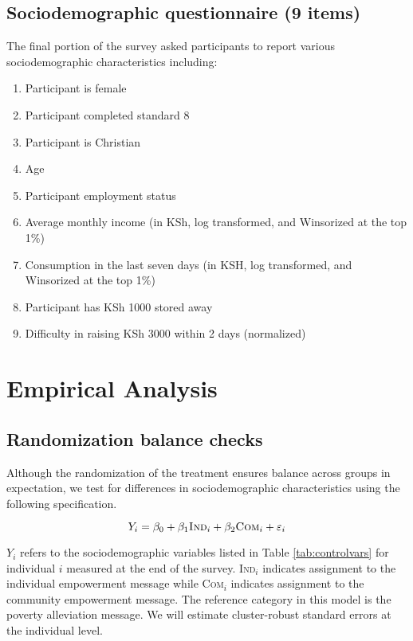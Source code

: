 \documentclass[11pt, a4paper]{article}\usepackage[]{graphicx}\usepackage[]{color}
\begin{document}
    \subsection{Sociodemographic questionnaire (9 items)}

        The final portion of the survey asked participants to report various sociodemographic characteristics including:

        \begin{enumerate}
        \itemsep0em
            \item Participant is female
            \item Participant completed standard 8
            \item Participant is Christian
            \item Age
            \item Participant employment status
            \item Average monthly income (in KSh, log transformed, and Winsorized at the top 1\%)
            \item Consumption in the last seven days (in KSH, log transformed, and Winsorized at the top 1\%)
            \item Participant has KSh 1000 stored away
            \item Difficulty in raising KSh 3000 within 2 days (normalized)
        \end{enumerate}

\section{Empirical Analysis}

    \subsection{Randomization balance checks}

        Although the randomization of the treatment ensures balance across groups in expectation, we test for differences in sociodemographic characteristics using the following specification.

        \begin{equation} \label{eq:balance}
        Y_{i} = \beta_{0} + \beta_{1}\text{\textsc{Ind}}_{i} + \beta_{2}\text{\textsc{Com}}_{i} + \varepsilon_{i}
        \end{equation}

        $Y_{i}$ refers to the sociodemographic variables listed in Table \ref{tab:controlvars} for individual $i$ measured at the end of the survey. \textsc{Ind}$_{i}$ indicates assignment to the individual empowerment message while \textsc{Com}$_{i}$ indicates assignment to the community empowerment message. The reference category in this model is the poverty alleviation message. We will estimate cluster-robust standard errors at the individual level. \\
\end{document}
